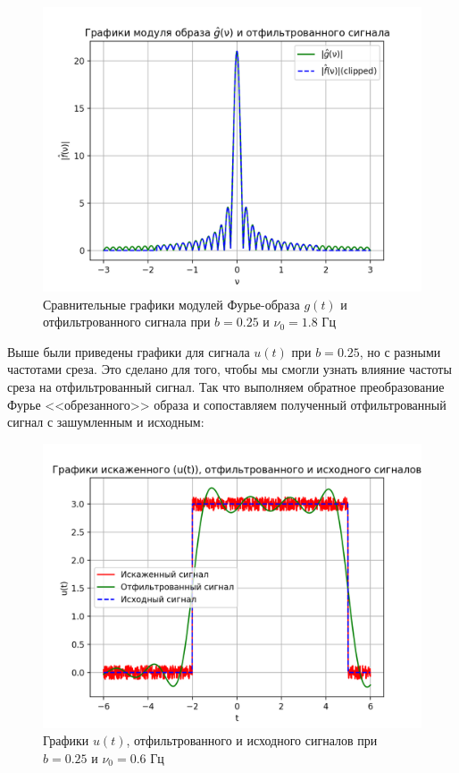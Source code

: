 \begin{figure}[ht!]
    \centering
    \includegraphics[scale=0.55]{media/1 task/high_freq/Fourier_Image_Comparison_0,25_-1,7987987987987988.png}
    \caption{Сравнительные графики модулей Фурье-образа $g(t)$ и отфильтрованного сигнала при $b=0.25$ и $\nu_0=1.8$ Гц}
    \label{fig:fourc_025_18}
\end{figure}

Выше были приведены графики для сигнала $u(t)$ при $b=0.25$, но с разными частотами среза. Это сделано для того, чтобы мы смогли узнать влияние частоты среза на отфильтрованный сигнал. Так что выполняем обратное преобразование Фурье <<обрезанного>> образа и сопоставляем полученный отфильтрованный сигнал с зашумленным и исходным:

\clearpage

\begin{figure}[ht!]
    \centering
    \includegraphics[scale=0.85]{media/1 task/high_freq/Cleaned_0,25_-0,5975975975975976.png}
    \caption{Графики  $u(t)$, отфильтрованного и исходного сигналов при $b=0.25$ и $\nu_0=0.6$ Гц}
    \label{fig:cleaned_025_06}
\end{figure}

